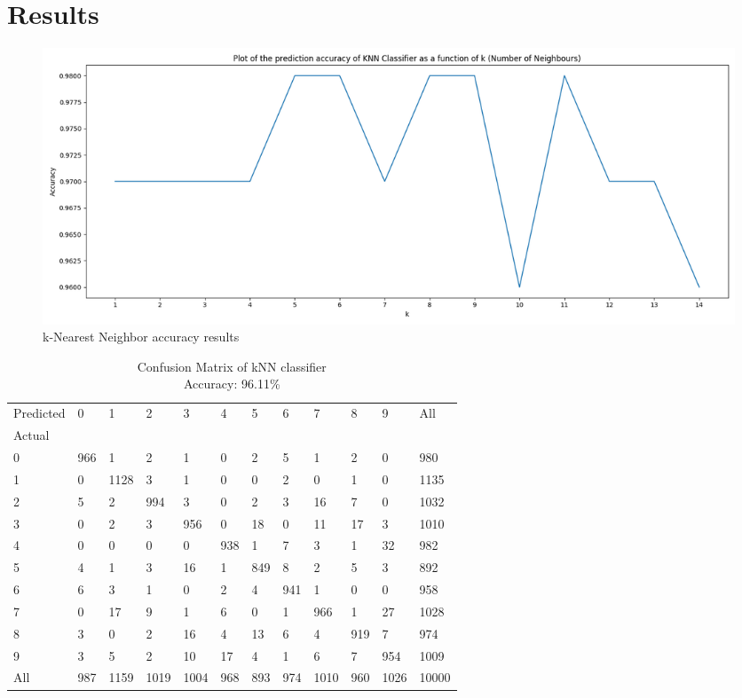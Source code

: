 \section*{Results}
\begin{figure}[H]
    \centering
    \includegraphics[width=\textwidth]{images/knn.png}
    \caption{k-Nearest Neighbor accuracy results}
    \setlength{\belowcaptionskip}{-20pt}
    \setlength{\abovecaptionskip}{-20pt}
\end{figure}


\begin{table}[H]
    \centering
    \begin{tabular}{llllllllllll}
        Predicted & 0 & 1  & 2 & 3  & 4  & 5 & 6  & 7  & 8 & 9  & All \\
        Actual \\
        0      & 966 & 1  & 2 & 1  & 0  & 2 & 5  & 1  & 2 & 0  & 980   \\
        1      & 0 & 1128 & 3 & 1  & 0  & 0 & 2  & 0  & 1 & 0  & 1135  \\
        2      & 5 & 2  & 994 & 3  & 0  & 2 & 3  & 16  & 7 & 0  & 1032   \\
        3      & 0 & 2  & 3 & 956 & 0  & 18 & 0  & 11  & 17 & 3  & 1010  \\
        4      & 0 & 0  & 0 & 0  & 938 & 1 & 7  & 3  & 1 & 32  & 982  \\
        5      & 4 & 1  & 3 & 16  & 1  & 849 & 8 &  2 & 5 & 3  & 892   \\
        6      & 6 & 3  & 1 & 0  & 2  & 4 & 941 & 1  & 0 & 0  & 958   \\
        7      & 0 & 17  & 9 & 1  & 6  & 0 & 1  & 966 & 1 & 27  & 1028  \\
        8      & 3 & 0  & 2 & 16  & 4  & 13 & 6  & 4  & 919 & 7  & 974   \\
        9      & 3 & 5  & 2 & 10  & 17  & 4 & 1  & 6  & 7 & 954 & 1009  \\
        All    & 987 & 1159 & 1019 & 1004 & 968 & 893 & 974  & 1010 & 960 & 1026 & 10000   
    \end{tabular}
    \caption*{Confusion Matrix of kNN classifier \\
    Accuracy: 96.11\%}
\end{table}

